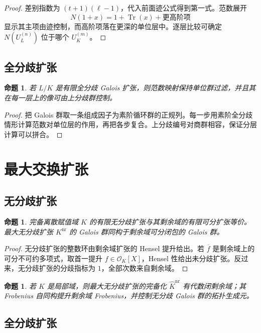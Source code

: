 \documentclass[11pt,a4paper,openany]{ctexbook}
\numberwithin{equation}{chapter}
\theoremstyle{plain}
\newtheorem{proposition}[theorem]{命题}
\theoremstyle{definition}
\theoremstyle{remark}
\begin{document}
\begin{proof}
差别指数为 $(t+1)(\ell-1)$，代入前面迹公式得到第一式。范数展开
\[
  N(1+x)=1+\operatorname{Tr}(x)+\text{更高阶项}
\]
显示其主项由迹控制，而高阶项落在更深的单位层中。逐层比较可确定 $N(U_L^{(n)})$ 位于哪个 $U_K^{(m)}$。
\end{proof}

\subsection{全分歧扩张}

\begin{proposition}
若 $L/K$ 是有限全分歧 Galois 扩张，则范数映射保持单位群过滤，并且其在每一层上的像可由上分歧群控制。
\end{proposition}

\begin{proof}
把 Galois 群取一条组成因子为素阶循环群的正规列。每一步用素阶全分歧情形计算范数对单位层的作用，再把各步复合。上分歧编号对商群相容，保证分层计算可以拼合。
\end{proof}

\section{最大交换扩张}

\subsection{无分歧扩张}

\begin{proposition}
完备离散赋值域 $K$ 的有限无分歧扩张与其剩余域的有限可分扩张等价。最大无分歧扩张 $K^{\mathrm{nr}}$ 的 Galois 群同构于剩余域可分闭包的 Galois 群。
\end{proposition}

\begin{proof}
无分歧扩张的整数环由剩余域扩张的 Hensel 提升给出。若 $\overline f$ 是剩余域上的可分不可约多项式，取首一提升 $f\in\mathcal O_K[X]$，Hensel 性给出未分歧扩张。反过来，无分歧扩张的分歧指标为 $1$，全部次数来自剩余域。
\end{proof}

\begin{proposition}
若 $K$ 是局部域，则最大无分歧扩张的完备化 $\widehat K^{\mathrm{nr}}$ 有代数闭剩余域；其 Frobenius 自同构提升剩余域 Frobenius，并控制无分歧 Galois 群的拓扑生成元。
\end{proposition}

\subsection{全分歧扩张}
\end{document}
